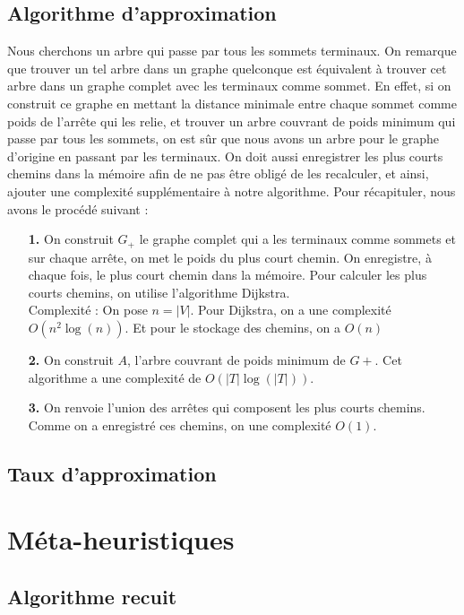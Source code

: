 \documentclass[11pt,french]{report}
\begin{document}
	\subsection{Algorithme d'approximation}
	Nous cherchons un arbre qui passe par tous les sommets terminaux. On remarque que trouver un tel arbre dans un graphe quelconque est équivalent à trouver cet arbre dans un graphe complet avec les terminaux comme sommet. En effet, si on construit ce graphe en mettant la distance minimale entre chaque sommet comme poids de l'arrête qui les relie, et trouver un arbre couvrant de poids minimum qui passe par tous les sommets, on est sûr que nous avons un arbre pour le graphe d'origine en passant par les terminaux. On doit aussi enregistrer les plus courts chemins dans la mémoire afin de ne pas être obligé de les recalculer, et ainsi, ajouter une complexité supplémentaire à notre algorithme. Pour récapituler, nous avons le procédé suivant : 
	\begin{itemize}
		\item[\textbf{1.}] On construit $G_+$ le graphe complet qui a les terminaux comme sommets et sur chaque arrête, on met le poids du plus court chemin. On enregistre, à chaque fois, le plus court chemin dans la mémoire. Pour calculer les plus courts chemins, on utilise l'algorithme Dijkstra.\\
		Complexité : On pose $n=|V|$. Pour Dijkstra, on a une complexité $O(n^2\log(n))$. Et pour le stockage des chemins, on a $O(n)$
		\\
		\item[\textbf{2.}] On construit $A$, l'arbre couvrant de poids minimum de $G+$. Cet algorithme a une complexité de $O(|T|\log(|T|))$.
		\\
		\item[\textbf{3.}] On renvoie l'union des arrêtes qui composent les plus courts chemins. Comme on a enregistré ces chemins, on une complexité $O(1)$.
	\end{itemize}
	
	\subsection{Taux d'approximation} 
	
	\section{Méta-heuristiques}
	
	\subsection{Algorithme recuit}
	
\end{document}
